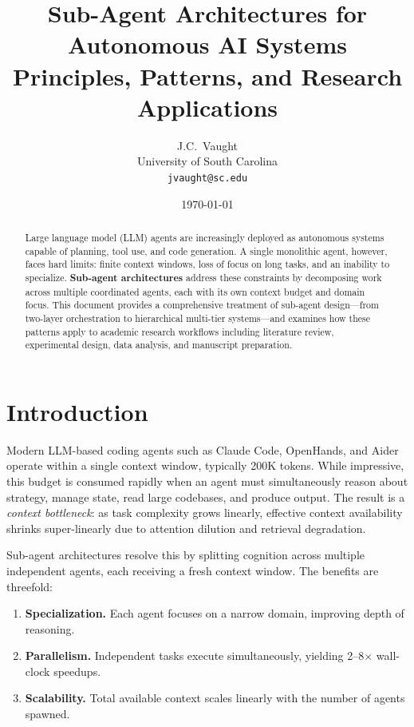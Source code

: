 \documentclass[11pt,letterpaper,twocolumn]{article}
\title{\textcolor{garnet}{\textbf{Sub-Agent Architectures for\\
  Autonomous AI Systems}}\\[6pt]
  \large\textcolor{bk70}{Principles, Patterns, and Research Applications}}
\author{J.C.\ Vaught\\
  \small University of South Carolina\\
  \small\texttt{jvaught@sc.edu}}
\date{\today}
\begin{document}
\maketitle
\thispagestyle{fancy}

\begin{abstract}
\noindent
Large language model (LLM) agents are increasingly deployed as autonomous
systems capable of planning, tool use, and code generation.  A single
monolithic agent, however, faces hard limits: finite context windows, loss of
focus on long tasks, and an inability to specialize.  \textbf{Sub-agent
architectures} address these constraints by decomposing work across multiple
coordinated agents, each with its own context budget and domain focus.  This
document provides a comprehensive treatment of sub-agent design---from
two-layer orchestration to hierarchical multi-tier systems---and examines how
these patterns apply to academic research workflows including literature
review, experimental design, data analysis, and manuscript preparation.
\end{abstract}

\section{Introduction}
\label{sec:intro}

Modern LLM-based coding agents such as Claude Code, OpenHands, and Aider
operate within a single context window, typically 200K tokens.  While
impressive, this budget is consumed rapidly when an agent must simultaneously
reason about strategy, manage state, read large codebases, and produce
output.  The result is a \emph{context bottleneck}: as task complexity grows
linearly, effective context availability shrinks super-linearly due to
attention dilution and retrieval degradation.

Sub-agent architectures resolve this by splitting cognition across multiple
independent agents, each receiving a fresh context window.  The benefits are
threefold:

\begin{enumerate}[leftmargin=*,itemsep=2pt]
  \item \textbf{Specialization.}  Each agent focuses on a narrow domain,
    improving depth of reasoning.
  \item \textbf{Parallelism.}  Independent tasks execute simultaneously,
    yielding 2--8$\times$ wall-clock speedups.
  \item \textbf{Scalability.}  Total available context scales linearly with
    the number of agents spawned.
\end{enumerate}
\end{document}
